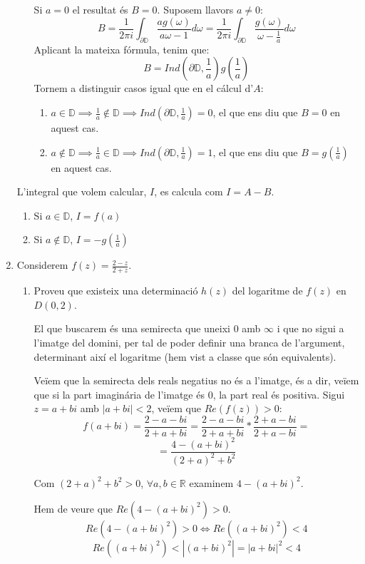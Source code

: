 \documentclass[10pt,a4paper]{article}
\begin{document}
\begin{enumerate}
\begin{framed}
\begin{enumerate}
	Si $a=0$ el resultat és $B=0$. Suposem llavors $a\neq 0$:
	$$B = \frac{1}{2\pi i}\int_{\partial\mathbb{D}}\frac{ag(\omega)}{a\omega - 1} d\omega 
	= \frac{1}{2\pi i}\int_{\partial\mathbb{D}}\frac{g(\omega)}{\omega - \frac{1}{a}}
	d\omega$$
	Aplicant la mateixa fórmula, tenim que:
	$$B = Ind\left(\partial\mathbb{D},\frac{1}{a}\right)g\left(\frac{1}{a}\right)$$
	Tornem a distinguir casos igual que en el cálcul d'$A$:
	\begin{enumerate}
		\item $a\in\mathbb{D} \implies \frac{1}{a}\notin\mathbb{D} \implies 
		Ind\left(\partial\mathbb{D},\frac{1}{a}\right)=0$, el que ens diu que $B=0$ en aquest cas.
		\item $a\notin\mathbb{D} \implies \frac{1}{a}\in\mathbb{D} \implies 
		Ind\left(\partial\mathbb{D},\frac{1}{a}\right)=1$, el que ens diu que $B=g(\frac{1}{a})$ en aquest cas.
	\end{enumerate}
\end{enumerate}

L'integral que volem calcular, $I$, es calcula com $I=A-B$.
\begin{enumerate}
	\item Si $a\in\mathbb{D}$, $I=f(a)$
	\item Si $a\notin\mathbb{D}$, $I=-g(\frac{1}{a})$
\end{enumerate}

\end{framed}
\item Considerem $f(z)=\frac{2-z}{2+z}$.
	\begin{enumerate}
	\item Proveu que existeix una determinació $h(z)$ del logaritme de $f(z)$ en $D(0,2)$.
	\begin{framed}
	El que buscarem és una semirecta que uneixi 0 amb $\infty$ i que no sigui a l'imatge del domini, per tal de poder definir una branca de l'argument, determinant així el logaritme (hem vist a classe que són equivalents).
	
	Veïem que la semirecta dels reals negatius no és a l'imatge, és a dir, veïem que si la part imaginária de l'imatge és 0, la part real és positiva. Sigui $z=a+bi$ amb $|a+bi| < 2$, veïem que $Re(f(z)) > 0$:
	$$f(a+bi) = \frac{2-a-bi}{2+a+bi} = \frac{2-a-bi}{2+a+bi}*\frac{2+a-bi}{2+a-bi} =$$
	$$= \frac{4-(a+bi)^{2}}{(2+a)^{2}+b^{2}}$$
	
	Com $(2+a)^{2} + b^{2} > 0$, $\forall a,b\in\mathbb{R}$ examinem $4-(a+bi)^{2}$.
	
	Hem de veure que $Re(4-(a+bi)^{2}) > 0$. 
	$$Re(4-(a+bi)^{2}) > 0 \iff Re((a+bi)^{2}) < 4$$ 
	$$Re((a+bi)^{2}) < |(a+bi)^{2}| = |a+bi|^{2} < 4$$
	

\end{framed}
\end{enumerate}
\end{enumerate}
\end{document}
